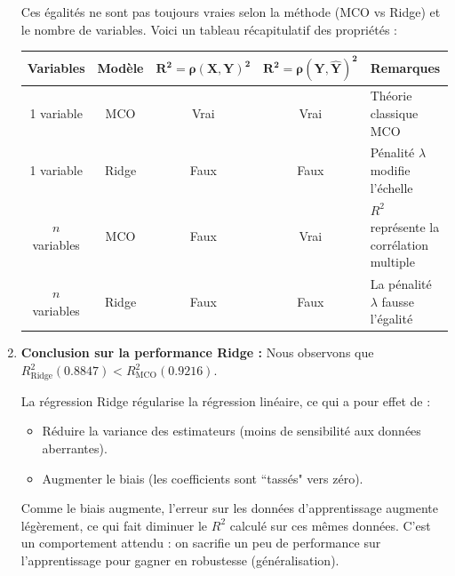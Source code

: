\documentclass[solutions]{../exercices}
\begin{document}
\begin{solution}
\begin{enumerate}
		Ces égalités ne sont pas toujours vraies selon la méthode (MCO vs Ridge) et le nombre de variables. Voici un tableau récapitulatif des propriétés :

		\begin{center}
			\begin{tabular}{|c|c|c|c|l|}
				\hline
				\textbf{Variables} & \textbf{Modèle} & $\mathbf{R^2 = \rho(X,Y)^2}$ & $\mathbf{R^2 = \rho(Y,\hat{Y})^2}$ & \textbf{Remarques} \\
				\hline
				1 variable & MCO & Vrai & Vrai & Théorie classique MCO \\
				\hline
				1 variable & Ridge & Faux & Faux & Pénalité $\lambda$ modifie l'échelle \\
				\hline
				$n$ variables & MCO & Faux & Vrai & $R^2$ représente la corrélation multiple \\
				\hline
				$n$ variables & Ridge & Faux & Faux & La pénalité $\lambda$ fausse l'égalité \\
				\hline
			\end{tabular}
		\end{center}

		\item \textbf{Conclusion sur la performance Ridge :}
		Nous observons que $R^2_{\text{Ridge}} (0.8847) < R^2_{\text{MCO}} (0.9216)$.

		La régression Ridge régularise la régression linéaire, ce qui a pour effet de :
		\begin{itemize}
			\item Réduire la variance des estimateurs (moins de sensibilité aux données aberrantes).
			\item Augmenter le biais (les coefficients sont ``tassés" vers zéro).
		\end{itemize}
		Comme le biais augmente, l'erreur sur les données d'apprentissage augmente légèrement, ce qui fait diminuer le $R^2$ calculé sur ces mêmes données. C'est un comportement attendu : on sacrifie un peu de performance sur l'apprentissage pour gagner en robustesse (généralisation).
	\end{enumerate}
\end{solution}
\end{document}
